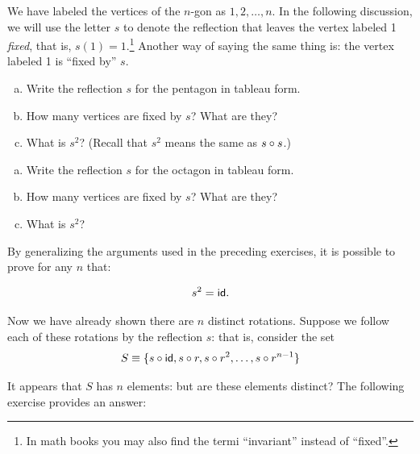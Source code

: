 We have labeled the vertices of the $n$-gon as $1,2,\ldots,n$. In the following discussion, we will use the letter  $s$ to denote the reflection that leaves the vertex labeled 1  \emph{fixed}, that is, $s(1) = 1$.\footnote{In math books you may also find the termi ``invariant'' instead of ``fixed''.}  Another way of saying the same thing is:  the vertex labeled 1 is ``fixed by'' $s$.

\begin{exercise}{}
\begin{enumerate}[(a)]
\item
Write the reflection $s$  for the pentagon in tableau form.  
\item
How many vertices are fixed by $s$? What are they?
\item
What is $s^2$?  (Recall that $s^2$ means the same as $s \circ s$.)
\end{enumerate}
\end{exercise}

\begin{exercise}{31}
\begin{enumerate}[(a)]
\item
Write the reflection $s$ for the octagon in tableau form. 
\item
How many vertices are fixed by $s$? What are they?
\item
What is $s^2$?
\end{enumerate}
\end{exercise}

By generalizing the arguments used in the preceding exercises, it is possible to prove for any $n$ that:

$$ s^2 = {\sf{i}d}.$$

Now we have already shown there are $n$ distinct rotations. Suppose we follow each of these rotations by the reflection $s$: that is, consider the set
\[
S \equiv \{s \circ {\sf{i}d}, s \circ r, s \circ r^2,
\ldots, s \circ r^{n-1}\}
\]

It appears that $S$ has $n$ elements: but are these elements distinct? The following exercise provides an answer:

